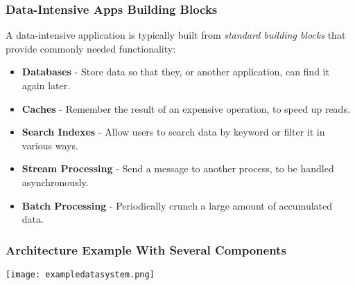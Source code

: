\documentclass{beamer}
\begin{document}
\begin{frame}\frametitle{Data-Intensive Apps Building Blocks}
\scriptsize
A data-intensive application is typically built from \emph{standard building blocks} that provide
commonly needed functionality:
\vfill
\begin{itemize}
    \item \textbf{Databases} - Store data so that they, or another application, can find it again later. \vfill
    \item \textbf{Caches} - Remember the result of an expensive operation, to speed up reads. \vfill
    \item \textbf{Search Indexes} - Allow users to search data by keyword or filter it in various ways. \vfill
    \item \textbf{Stream Processing} - Send a message to another process, to be handled asynchronously. \vfill
    \item \textbf{Batch Processing} - Periodically crunch a large amount of accumulated data.
\end{itemize}

\end{frame}

\begin{frame}\frametitle{Architecture Example With Several Components}
\begin{center}
    \texttt{[image: exampledatasystem.png]}
\end{center}
\end{frame}
\end{document}
